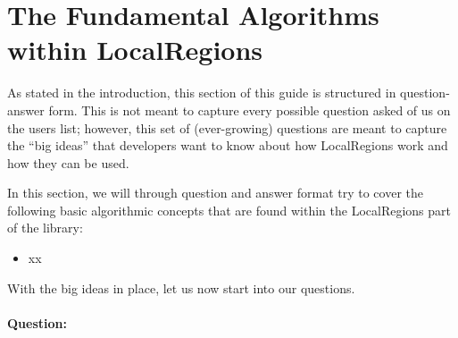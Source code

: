 %
\section{The Fundamental Algorithms within LocalRegions}

As stated in the introduction, this section of this guide is structured in question-answer form.  This is not meant to capture every possible
question asked of us on the {\nek} users list; however, this set of (ever-growing) questions are meant to capture the ``big ideas'' that developers 
want to know about how LocalRegions work and how they can be used.  

In this section, we will through question and answer format try to cover the following basic algorithmic concepts that are found within 
the LocalRegions part of the library:

\begin{itemize}
\item xx
\end{itemize}

With the big ideas in place, let us now start into our questions.

\paragraph{Question:}
